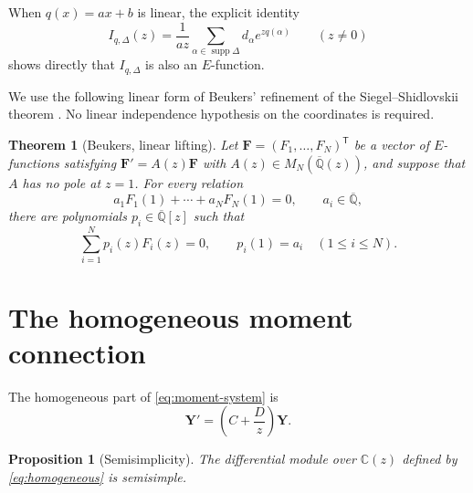 \documentclass[11pt]{article}
\numberwithin{equation}{section}
\newtheorem{theorem}{Theorem}[section]
\newtheorem{proposition}[proposition]{Proposition}
\theoremstyle{definition}
\theoremstyle{remark}
\newcommand{\C}{\mathbb C}
\newcommand{\Qbar}{\overline{\mathbb Q}}
\newcommand{\supp}{\operatorname{supp}}
\begin{document}
When $q(x)=ax+b$ is linear, the explicit identity
\begin{equation}\label{eq:linear-formula}
  I_{q,\Delta}(z)
  =\frac1{az}\sum_{\alpha\in\supp\Delta}
       d_\alpha e^{zq(\alpha)}
  \qquad(z\ne0)
\end{equation}
shows directly that $I_{q,\Delta}$ is also an $E$-function.

We use the following linear form of Beukers' refinement of the
Siegel--Shidlovskii theorem
\cite[Theorem~3.2 and Lemma~3.1]{Beukers}.  No linear independence
hypothesis on the coordinates is required.

\begin{theorem}[Beukers, linear lifting]\label{thm:Beukers}
Let $\mathbf F=(F_1,\ldots,F_N)^{\mathsf T}$ be a vector of $E$-functions
satisfying $\mathbf F'=A(z)\mathbf F$ with
$A(z)\in M_N(\Qbar(z))$, and suppose that $A$ has no pole at $z=1$.
For every relation
\[
  a_1F_1(1)+\cdots+a_NF_N(1)=0,
  \qquad a_i\in\Qbar,
\]
there are polynomials $p_i\in\Qbar[z]$ such that
\[
  \sum_{i=1}^N p_i(z)F_i(z)=0,
  \qquad p_i(1)=a_i\quad(1\le i\le N).
\]
\end{theorem}

\section{The homogeneous moment connection}

The homogeneous part of \eqref{eq:moment-system} is
\begin{equation}\label{eq:homogeneous}
  \mathbf Y'=\left(C+\frac Dz\right)\mathbf Y.
\end{equation}

\begin{proposition}[Semisimplicity]\label{prop:semisimplicity}
The differential module over $\C(z)$ defined by
\eqref{eq:homogeneous} is semisimple.
\end{proposition}
\end{document}

